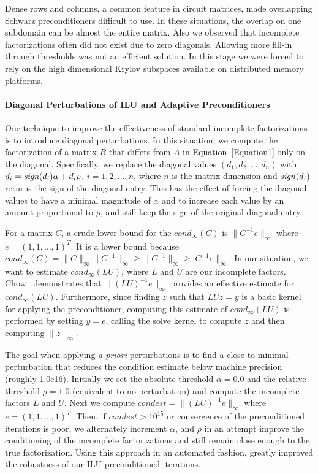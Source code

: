 \documentclass[10pt,fleqn]{article}
\newcommand{\sign}{{\it sign}}
\begin{document}
Dense rows and columns, a common feature 
in circuit matrices, made overlapping Schwarz preconditioners
difficult to use.  In these situations, the overlap on one subdomain
can be almost the entire matrix.  Also we observed that incomplete
factorizations often did not exist due to zero diagonals.  Allowing more
fill-in through thresholds was not an efficient solution.  In this stage we 
were forced to rely on the high dimensional Krylov subspaces available
on distributed memory platforms.  

\paragraph{Diagonal Perturbations of ILU and Adaptive Preconditioners}
One technique to improve the effectiveness of standard
incomplete factorizations is to introduce diagonal perturbations.  In
this situation, we compute the factorization of a matrix $B$ that
differs from $A$ in Equation~\ref{Equation1} only on the diagonal.
Specifically, we replace the diagonal values $(d_1, d_2, \ldots, d_n)$
with $d_i = \sign(d_i)\alpha + d_i\rho$, $i=1, 2, \ldots, n$, where
$n$ is the matrix dimension and $\sign(d_i)$ returns
the sign of the diagonal entry.  This has the effect of
forcing the diagonal values to have a minimal magnitude of $\alpha$ and
to increase each value by an amount proportional to $\rho$, and still keep
the sign of the original diagonal entry.

For a matrix $C$, a crude lower bound for the $cond_\infty(C)$ is
$\|C^{-1}e\|_\infty$ where $e = (1, 1, \ldots, 1)^T$.  It is a
lower bound because $cond_\infty(C) = \|C\|_\infty\|C^{-1}\|_\infty
\ge \|C^{-1}\|_\infty \ge |C^{-1}e\|_\infty$.
In our situation, we want to estimate $cond_\infty(LU)$, where $L$ and
$U$ are our incomplete factors.  Chow~\cite{Chow:97} demonstrates that
$\|(LU)^{-1}e\|_\infty$ provides an effective estimate for
$cond_\infty(LU)$.  Furthermore, since finding $z$ such that $LUz = y$
is a basic kernel for applying the preconditioner, computing this
estimate of $cond_\infty(LU)$ is performed by setting $y = e$, calling
the solve kernel to compute $z$ and then
computing $\|z\|_\infty$.

The goal when applying {\it a priori} perturbations is to find a close to minimal
perturbation that reduces the condition estimate below machine
precision (roughly 1.0e16). Initially we set the absolute threshold 
$\alpha = 0.0$ and the relative
threshold $\rho = 1.0$ (equivalent to no perturbation) and compute the
incomplete factors $L$ and $U$.  Next we compute 
$condest = \|(LU)^{-1}e\|_\infty$ where $e = (1, 1,
\ldots, 1)^T$. Then,  if $condest > 10^{15}$ or convergence of the
preconditioned iterations is poor,
we alternately increment $\alpha$, and $\rho$ in an attempt improve
the conditioning of the incomplete factorizations and still remain
close enough to the true factorization.  Using this approach in an
automated fashion, greatly improved the robustness of our ILU
preconditioned iterations.
\end{document}
